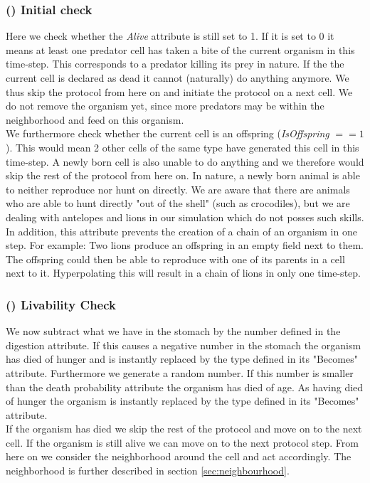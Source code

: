 \documentclass[11pt]{article}
\begin{document}
\subsubsection{() Initial check} 
Here we check whether the {\it Alive} attribute is still set to 1. If it is set to 0 it means at least one predator cell has taken a bite of the current organism in this time-step.  This corresponds to a predator killing its prey in nature. If the the current cell is declared as dead it cannot (naturally) do anything anymore. We thus skip the protocol from here on and initiate the protocol on a next cell. We do not remove the organism yet, since more predators may be within the neighborhood and feed on this organism.
\\We furthermore check whether the current cell is an offspring ({\it IsOffspring} $== 1$). This would mean 2 other cells of the same type have generated this cell in this time-step. A newly born cell is also unable to do anything and we therefore would skip the rest of the protocol from here on. In nature, a newly born animal is able to neither reproduce nor hunt on directly. We are aware that there are animals who are able to hunt directly "out of the shell" (such as crocodiles), but we are dealing with antelopes and lions in our simulation which do not posses such skills. In addition, this attribute prevents the creation of a chain of an organism in one step. For example: Two lions produce an offspring in an empty field next to them. The offspring could then be able to reproduce with one of its parents in a cell next to it. Hyperpolating this will result in a chain of lions in only one time-step.

\addtocounter{protocolCounter}{1}
\subsubsection{() Livability Check} 
We now subtract what we have in the stomach by the number defined in the digestion attribute. If this causes a negative number in the stomach the organism has died of hunger and is instantly replaced by the type defined in its "Becomes" attribute. Furthermore we generate a random number. If this number is smaller than the death probability attribute the organism has died of age. As having died of hunger the organism is instantly replaced by the type defined in its "Becomes" attribute.\\
If the organism has died we skip the rest of the protocol and move on to the next cell. If the organism is still alive we can move on to the next protocol step. From here on we consider the neighborhood around the cell and act accordingly. The neighborhood is further described in section \ref{sec:neighbourhood}.
\addtocounter{protocolCounter}{1}
\end{document}

